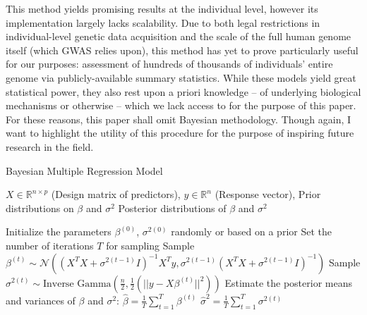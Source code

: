 \documentclass[12pt]{article}
\begin{document}
This method yields promising results at the individual level, however its implementation largely lacks scalability. Due to both legal restrictions in individual-level genetic data acquisition and the scale of the full human genome itself (which GWAS relies upon), this method has yet to prove particularly useful for our purposes: assessment of hundreds of thousands of individuals' entire genome via publicly-available summary statistics. While these models yield great statistical power, they also rest upon a priori knowledge -- of underlying biological mechanisms or otherwise -- which we lack access to for the purpose of this paper. For these reasons, this paper shall omit Bayesian methodology. Though again, I want to highlight the utility of this procedure for the purpose of inspiring future research in the field. \par

\begin{algorithm}
    \caption{Bayesian Multiple Regression Model}
    \begin{algorithmic}[1]
        \Require $X \in \mathbb{R}^{n \times p}$ (Design matrix of predictors), $y \in \mathbb{R}^n$ (Response vector), Prior distributions on $\beta$ and $\sigma^2$
        \Ensure Posterior distributions of $\beta$ and $\sigma^2$
        
        \State Initialize the parameters $\beta^{(0)}$, $\sigma^{2(0)}$ randomly or based on a prior
        \State Set the number of iterations $T$ for sampling
            \State Sample $\beta^{(t)} \sim \mathcal{N}((X^T X + \sigma^{2(t-1)} I)^{-1} X^T y, \sigma^{2(t-1)}(X^T X + \sigma^{2(t-1)} I)^{-1})$  
            \State Sample $\sigma^{2(t)} \sim \text{Inverse Gamma} \left( \frac{n}{2}, \frac{1}{2} \left( ||y - X\beta^{(t)}||^2 \right) \right)$ 
        \EndFor
        \State Estimate the posterior means and variances of $\beta$ and $\sigma^2$:
        \State \quad $\hat{\beta} = \frac{1}{T} \sum_{t=1}^{T} \beta^{(t)}$
        \State \quad $\hat{\sigma}^2 = \frac{1}{T} \sum_{t=1}^{T} \sigma^{2(t)}$
    \end{algorithmic}
\end{algorithm}
\newpage
\end{document}

